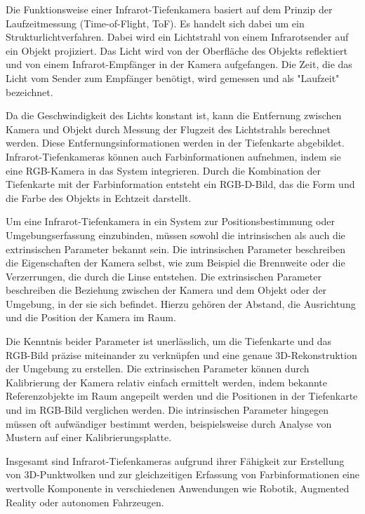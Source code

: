     Die Funktionsweise einer Infrarot-Tiefenkamera basiert auf dem Prinzip der Laufzeitmessung (Time-of-Flight, ToF). 
    Es handelt sich dabei um ein Strukturlichtverfahren.
    Dabei wird ein Lichtstrahl von einem Infrarotsender auf ein Objekt projiziert. Das Licht wird von der Oberfläche des Objekts reflektiert und von einem Infrarot-Empfänger in der Kamera aufgefangen. Die Zeit, die das Licht vom Sender zum Empfänger benötigt, wird gemessen und als "Laufzeit" bezeichnet.
    
    Da die Geschwindigkeit des Lichts konstant ist, kann die Entfernung zwischen Kamera und Objekt durch Messung der Flugzeit des Lichtstrahls berechnet werden. Diese Entfernungsinformationen werden in der Tiefenkarte abgebildet. Infrarot-Tiefenkameras können auch Farbinformationen aufnehmen, indem sie eine RGB-Kamera in das System integrieren. Durch die Kombination der Tiefenkarte mit der Farbinformation entsteht ein RGB-D-Bild, das die Form und die Farbe des Objekts in Echtzeit darstellt.

    Um eine Infrarot-Tiefenkamera in ein System zur Positionsbestimmung oder Umgebungserfassung einzubinden, müssen sowohl die intrinsischen als auch die extrinsischen Parameter bekannt sein. Die intrinsischen Parameter beschreiben die Eigenschaften der Kamera selbst, wie zum Beispiel die Brennweite oder die Verzerrungen, die durch die Linse entstehen. Die extrinsischen Parameter beschreiben die Beziehung zwischen der Kamera und dem Objekt oder der Umgebung, in der sie sich befindet. Hierzu gehören der Abstand, die Ausrichtung und die Position der Kamera im Raum.

    Die Kenntnis beider Parameter ist unerlässlich, um die Tiefenkarte und das RGB-Bild präzise miteinander zu verknüpfen und eine genaue 3D-Rekonstruktion der Umgebung zu erstellen. Die extrinsischen Parameter können durch Kalibrierung der Kamera relativ einfach ermittelt werden, indem bekannte Referenzobjekte im Raum angepeilt werden und die Positionen in der Tiefenkarte und im RGB-Bild verglichen werden. Die intrinsischen Parameter hingegen müssen oft aufwändiger bestimmt werden, beispielsweise durch Analyse von Mustern auf einer Kalibrierungsplatte.
    
    Insgesamt sind Infrarot-Tiefenkameras aufgrund ihrer Fähigkeit zur Erstellung von 3D-Punktwolken und zur gleichzeitigen Erfassung von Farbinformationen eine wertvolle Komponente in verschiedenen Anwendungen wie Robotik, Augmented Reality oder autonomen Fahrzeugen. 
    \cite[vgl.][Kapitel 3]{Tychola2022}

